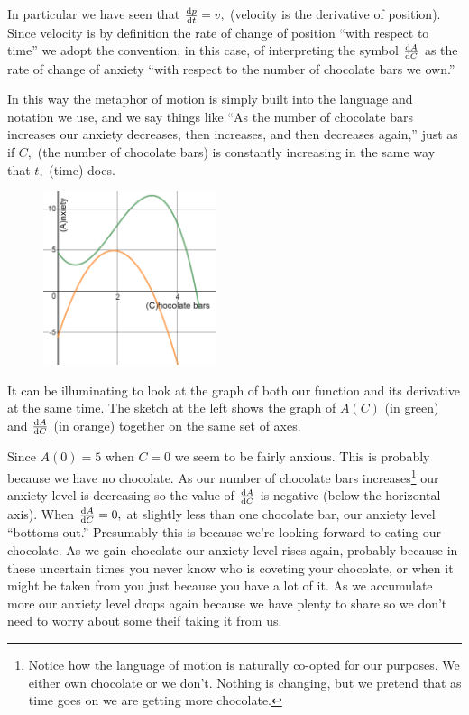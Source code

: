 In particular we have seen that $\frac{\text{d}{p}}{\text{d}{t}}=v,$ (velocity is the
derivative of position). Since velocity is by definition the rate of
change of position ``with respect to time'' we adopt the convention,
in this case, of interpreting the symbol $\frac{\text{d}{A}}{\text{d}{C}}$ as the rate of
change of anxiety ``with respect to the number of chocolate bars we
own.''  

In this way the metaphor of motion is simply built into the language
and notation we use, and we say things like ``As the number of
chocolate bars increases our anxiety decreases, then increases, and
then decreases again,'' just as if $C,$  (the number of chocolate
bars) is constantly increasing in the same way that $t,$ (time) does.


\begin{figure}
\captionsetup{labelformat=empty}
\centerline{\includegraphics*[height=2in,width=2in]{Figures/metaphor2}}
\label{fig:metaphor2}
\end{figure}
It can be illuminating to look at the graph of both our function and
its derivative at the same time. The sketch at the left shows the graph
of $A(C)$ (in green) and $\frac{\text{d}{A}}{\text{d}{C}}$ (in orange) together on the
same set of axes.

Since $A(0) = 5$ when $C=0$ we seem to be fairly anxious. This is probably
because we have no chocolate. As our number of chocolate bars
increases\footnote{Notice how the language of motion is naturally
  co-opted for our purposes. We either own chocolate or we
  don't. Nothing is changing, but we pretend that as time goes on we
  are getting more chocolate.}
our anxiety level is decreasing so the value of $\frac{\text{d}{A}}{\text{d}{C}}$ is
negative (below the horizontal axis). When $\frac{\text{d}{A}}{\text{d}{C}} =0,$ at
slightly less than one chocolate bar, our anxiety level ``bottoms
out.'' Presumably this is because we're looking forward to eating our
chocolate. As we gain chocolate our anxiety level rises again,
probably because in these uncertain times you never know who is
coveting your chocolate, or when it might be taken from you just because you
have a lot of it. As we accumulate more our anxiety level drops again
because we have plenty to share so we don't need to worry about some
theif taking it from us. 

